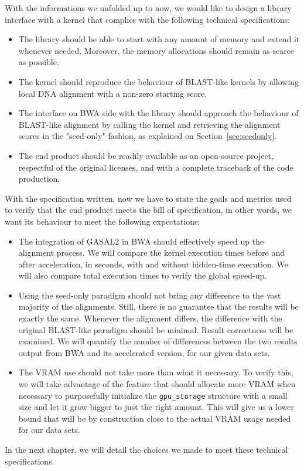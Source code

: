 With the informations we unfolded up to now, we would like to design a library interface with a kernel that complies with the following technical specifications:

\begin{itemize}
	\item The library should be able to start with any amount of memory and extend it whenever needed. Moreover, the memory allocations should remain as scarce as possible.
	\item The kernel should reproduce the behaviour of BLAST-like kernels by allowing local DNA alignment with a non-zero starting score.
	\item The interface on BWA side with the library should approach the behaviour of BLAST-like alignment by calling the kernel and retrieving the alignment scores in the "seed-only" fashion, as explained on Section~\ref{sec:seedonly}.
	\item The end product should be readily available as an open-source project, respectful of the original licenses, and with a complete traceback of the code production.
\end{itemize}

With the specification written, now we have to state the goals and metrics used to verify that the end product meets the bill of specification, in other words, we want its behaviour to meet the following expectations: 

\begin{itemize}
	\item The integration of GASAL2 in BWA should effectively speed up the alignment process. We will compare the kernel execution times before and after acceleration, in seconds, with and without hidden-time execution. We will also compare total execution times to verify the global speed-up.
	
	\item Using the seed-only paradigm should not bring any difference to the vast majority of the alignments. Still, there is no guarantee that the results will be exactly the same. Whenever the alignment differs, the difference with the original BLAST-like paradigm should be minimal. Result correctness will be examined. We will quantify the number of differences between the two results output from BWA and its accelerated version, for our given data sets.
	
	\item The VRAM use should not take more than what it necessary. To verify this, we will take advantage of the feature that should allocate more VRAM when necessary to purposefully initialize the \verb|gpu_storage| structure with a small size and let it grow bigger to just the right amount. This will give us a lower bound that will be by construction close to the actual VRAM usage needed for our data sets.
	
\end{itemize}

In the next chapter, we will detail the choices we made to meet these technical specifications.
